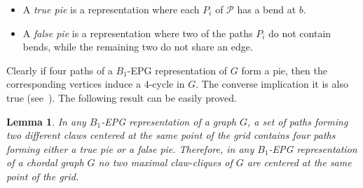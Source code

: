 \documentclass[9pt]{entcs}
\newtheorem{lema}{Lemma}[section]
\newtheorem{defi}{Definition}[section]
\begin{document}
\begin{itemize}
\item A \emph{true pie} is a representation where each $P_i$ of $ \mathcal{P} $ has a bend at $b$.

\item A \emph {false pie} is a representation where two of the paths $P_i$ do not contain bends, while the remaining two do not share an edge. 

%


\end{itemize}

Clearly if four paths of a $B_1$-EPG representation of $G$ form a pie, then the corresponding vertices induce a $4$-cycle in $G$. The converse implication it is also true (see~\cite{golumbic2009}). The following result can be easily proved.

\begin{lema}\label{lem:twoClawNotSameCenterInChordal}
In any $B_1$-EPG representation of a graph $G$, a set of paths forming two different claws centered at the same point of the grid contains four paths forming either a true pie or a false pie. Therefore, in any $B_1$-EPG representation of a chordal graph $G$ no two maximal claw-cliques of $G$ are centered at the same point of the grid.
\end{lema}



\end{document}
